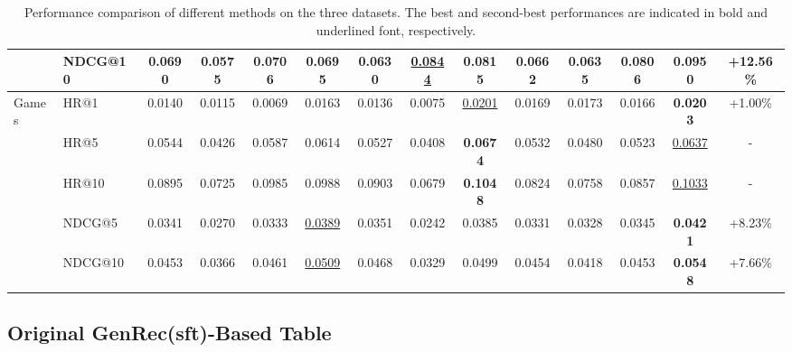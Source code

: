 \begin{table}[H]
{\begin{tabular}{llcccccccccccc}
 & NDCG@10 & 0.0690 & 0.0575 & 0.0706 & 0.0695 & 0.0630 & \underline{0.0844} & 0.0815 & 0.0662 & 0.0635 & 0.0806 & \textbf{0.0950} & +12.56\% \\
\midrule
Games & HR@1 & 0.0140 & 0.0115 & 0.0069 & 0.0163 & 0.0136 & 0.0075 & \underline{0.0201} & 0.0169 & 0.0173 & 0.0166 & \textbf{0.0203} & +1.00\% \\
 & HR@5 & 0.0544 & 0.0426 & 0.0587 & 0.0614 & 0.0527 & 0.0408 & \textbf{0.0674} & 0.0532 & 0.0480 & 0.0523 & \underline{0.0637} & - \\
 & HR@10 & 0.0895 & 0.0725 & 0.0985 & 0.0988 & 0.0903 & 0.0679 & \textbf{0.1048} & 0.0824 & 0.0758 & 0.0857 & \underline{0.1033} & - \\
 & NDCG@5 & 0.0341 & 0.0270 & 0.0333 & \underline{0.0389} & 0.0351 & 0.0242 & 0.0385 & 0.0331 & 0.0328 & 0.0345 & \textbf{0.0421} & +8.23\% \\
 & NDCG@10 & 0.0453 & 0.0366 & 0.0461 & \underline{0.0509} & 0.0468 & 0.0329 & 0.0499 & 0.0454 & 0.0418 & 0.0453 & \textbf{0.0548} & +7.66\% \\
\bottomrule
\end{tabular}%
}
\caption{Performance comparison of different methods on the three datasets. The best and second-best performances are indicated in bold and underlined font, respectively.}
\label{tab:appendix-paper-reference-mql4grec}
\end{table}

\subsection{Original GenRec(sft)-Based Table}

